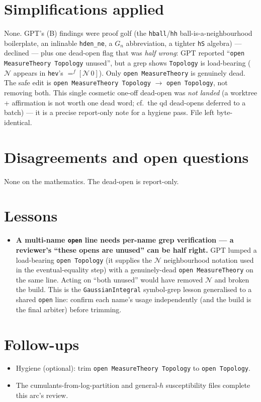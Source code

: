\documentclass[11pt]{article}
\begin{document}
\section{Simplifications applied}
None. GPT's (B) findings were proof golf (the \texttt{hball}/\texttt{hh} ball-is-a-neighbourhood boilerplate,
an inlinable \texttt{hden\_ne}, a $G_n$ abbreviation, a tighter \texttt{hS} algebra) --- declined --- plus one
dead-open flag that was \emph{half wrong}: GPT reported ``\texttt{open MeasureTheory Topology} unused'', but a
grep shows \texttt{Topology} is load-bearing ($\mathcal N$ appears in \texttt{hev}'s $=^f[\mathcal N\,0]$). Only
\texttt{open MeasureTheory} is genuinely dead. The safe edit is \texttt{open MeasureTheory Topology}
$\to$ \texttt{open Topology}, not removing both. This single cosmetic one-off dead-open was \emph{not landed}
(a worktree + affirmation is not worth one dead word; cf.\ the qd dead-opens deferred to a batch) --- it is a
precise report-only note for a hygiene pass. File left byte-identical.

\section{Disagreements and open questions}
None on the mathematics. The dead-open is report-only.

\section{Lessons}
\begin{itemize}[noitemsep]
  \item \textbf{A multi-name \texttt{open} line needs per-name grep verification --- a reviewer's ``these
    opens are unused'' can be half right.} GPT lumped a load-bearing \texttt{open Topology} (it supplies the
    $\mathcal N$ neighbourhood notation used in the eventual-equality step) with a genuinely-dead
    \texttt{open MeasureTheory} on the same line. Acting on ``both unused'' would have removed $\mathcal N$ and
    broken the build. This is the \texttt{GaussianIntegral} symbol-grep lesson generalised to a shared
    \texttt{open} line: confirm each name's usage independently (and the build is the final arbiter) before
    trimming.
\end{itemize}

\section{Follow-ups}
\begin{itemize}[noitemsep]
  \item Hygiene (optional): trim \texttt{open MeasureTheory Topology} to \texttt{open Topology}.
  \item The cumulants-from-log-partition and general-$h$ susceptibility files complete this arc's review.
\end{itemize}
\end{document}
